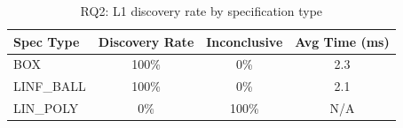 \begin{table}[t]
\centering
\caption{RQ2: L1 discovery rate by specification type}
\label{tab:rq2-spec}
\small
\begin{tabular}{lccc}
\toprule
\textbf{Spec Type} & \textbf{Discovery Rate} & \textbf{Inconclusive} & \textbf{Avg Time (ms)} \\
\midrule
\textsc{BOX} & 100\% & 0\% & 2.3 \\
\textsc{LINF\_BALL} & 100\% & 0\% & 2.1 \\
\textsc{LIN\_POLY} & 0\% & 100\% & N/A \\
\bottomrule
\end{tabular}
\end{table}